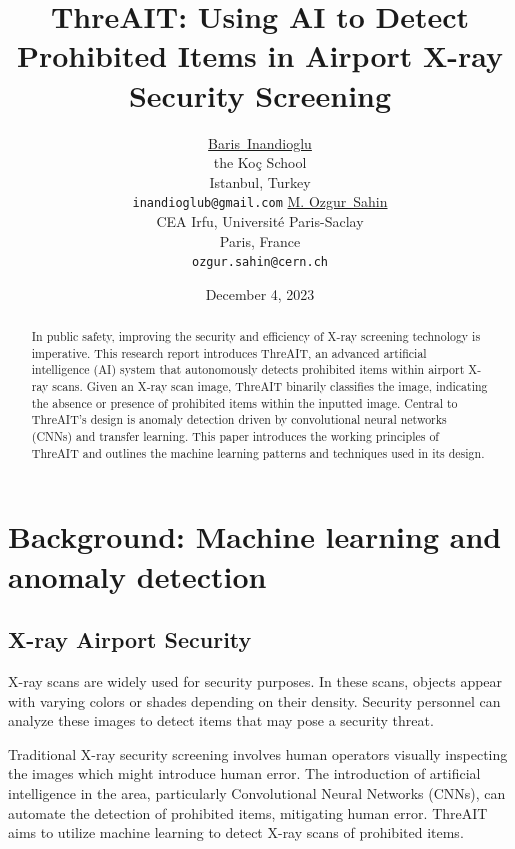 \documentclass{article}
\title{ThreAIT: Using AI to Detect Prohibited Items in Airport X-ray Security Screening}
\date{December 4, 2023}
\author{
    \href{https://orcid.org/0000-0000-0000-0000}{Baris~Inandioglu} \\ 
        the Koç School \\
        Istanbul, Turkey \\
        \texttt{inandioglub@gmail.com}
    \And
    \href{https://orcid.org/0000-0003-2766-2816}{M. Ozgur~Sahin} \\
        CEA Irfu, Université Paris-Saclay \\
        Paris, France \\
        \texttt{ozgur.sahin@cern.ch}
}
\begin{document}
\maketitle

\begin{abstract}

In public safety, improving the security and efficiency of X-ray screening technology is imperative. This research report introduces ThreAIT, an advanced artificial intelligence (AI) system that autonomously detects prohibited items within airport X-ray scans. Given an X-ray scan image, ThreAIT binarily classifies the image, indicating the absence or presence of prohibited items within the inputted image. Central to ThreAIT's design is anomaly detection driven by convolutional neural networks (CNNs) and transfer learning. This paper introduces the working principles of ThreAIT and outlines the machine learning patterns and techniques used in its design.

\end{abstract}


\newpage
\tableofcontents
\newpage

\section{Background: Machine learning and anomaly detection}

\subsection{X-ray Airport Security}
X-ray scans are widely used for security purposes. In these scans, objects appear with varying colors or shades depending on their density. Security personnel can analyze these images to detect items that may pose a security threat.

Traditional X-ray security screening involves human operators visually inspecting the images which might introduce human error. The introduction of artificial intelligence in the area, particularly Convolutional Neural Networks (CNNs), can automate the detection of prohibited items, mitigating human error. ThreAIT aims to utilize machine learning to detect X-ray scans of prohibited items.
\end{document}
